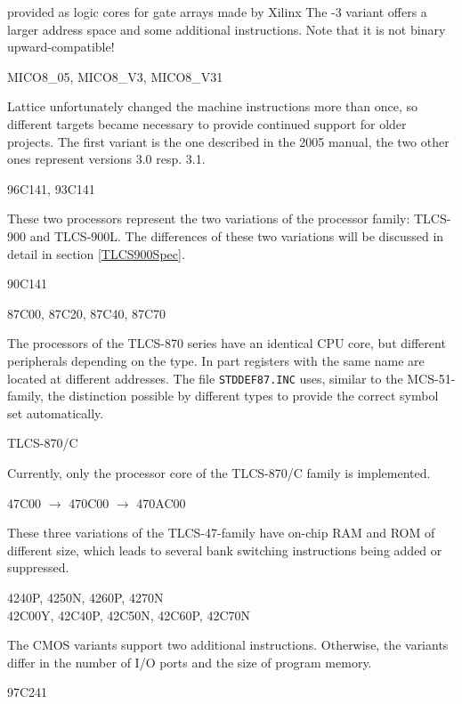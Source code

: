 \documentclass[12pt,twoside]{report}
\newcommand{\tty}[1]{{\tt #1}}
\begin{document}
provided as logic cores for gate arrays made by Xilinx The -3 variant
offers a larger address space and some additional instructions.  Note that
it is not binary upward-compatible!
\begin{cpulist}
   MICO8\_05, MICO8\_V3, MICO8\_V31
\end{cpulist}
Lattice unfortunately changed the machine instructions more than once, so
different targets became necessary to provide continued support for older
projects.  The first variant is the one described in the 2005 manual, the
two other ones represent versions 3.0 resp. 3.1.
\begin{cpulist}
   96C141, 93C141
\end{cpulist}
These two processors represent the two variations of the processor
family: TLCS-900 and TLCS-900L.  The differences of these two variations
will be discussed in detail in section \ref{TLCS900Spec}.
\begin{cpulist}
   90C141
\end{cpulist}
\begin{cpulist}
   87C00, 87C20, 87C40, 87C70
\end{cpulist}
The processors of the TLCS-870 series have an identical CPU core, but
different peripherals depending on the type.  In part registers with
the same name are located at different addresses.  The file
\tty{STDDEF87.INC} uses, similar to the MCS-51-family, the distinction
possible by different types to provide the correct symbol set
automatically.
\begin{cpulist}
   TLCS-870/C
\end{cpulist}
Currently, only the processor core of the TLCS-870/C family is
implemented.
\begin{cpulist}
   47C00 $\rightarrow$ 470C00 $\rightarrow$ 470AC00
\end{cpulist}
These three variations of the TLCS-47-family have on-chip RAM and ROM
of different size, which leads to several bank switching instructions
being added or suppressed.
\begin{cpulist}
4240P, 4250N, 4260P, 4270N \\
42C00Y, 42C40P, 42C50N, 42C60P, 42C70N\\
\end{cpulist}
The CMOS variants support two additional instructions.  Otherwise, the
variants differ in the number of I/O ports and the size of program
memory.
\begin{cpulist}
   97C241
\end{cpulist}
\end{document}
